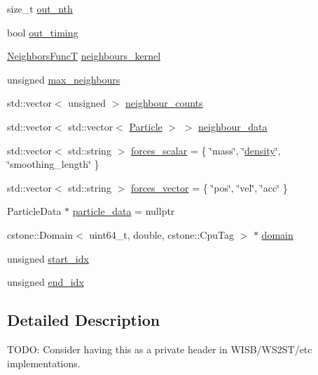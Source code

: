 \begin{DoxyCompactItemize}
size\+\_\+t \mbox{\hyperlink{namespacewash_aa9f79200cc65dc6e48b4ef9af5d0c389}{out\+\_\+nth}}
\item 
bool \mbox{\hyperlink{namespacewash_a6e885743f18d66ca373fb6c4c0146d1d}{out\+\_\+timing}}
\item 
\mbox{\hyperlink{namespacewash_a8135d763bfc59fce07b49873d8af0ed6}{Neighbors\+FuncT}} \mbox{\hyperlink{namespacewash_a0d969973e893cc2316bad2597bf0ad17}{neighbours\+\_\+kernel}}
\item 
unsigned \mbox{\hyperlink{namespacewash_a17d27449eff38aaca1e4206070bbb868}{max\+\_\+neighbours}}
\item 
std\+::vector$<$ unsigned $>$ \mbox{\hyperlink{namespacewash_a15b300d4e8a12c38c1e54650db4476f1}{neighbour\+\_\+counts}}
\item 
std\+::vector$<$ std\+::vector$<$ \mbox{\hyperlink{classwash_1_1Particle}{Particle}} $>$ $>$ \mbox{\hyperlink{namespacewash_aa6580757775fdbcb82b9a6b6f75332a1}{neighbour\+\_\+data}}
\item 
std\+::vector$<$ std\+::string $>$ \mbox{\hyperlink{namespacewash_a9c297685f13f82d6f804157081b56402}{forces\+\_\+scalar}} = \{ \char`\"{}mass\char`\"{}, \char`\"{}\mbox{\hyperlink{3d__fluid__sim_2fluid__sim_8cpp_a140d94d7edb97c062961056d1926a2db}{density}}\char`\"{}, \char`\"{}smoothing\+\_\+length\char`\"{} \}
\item 
std\+::vector$<$ std\+::string $>$ \mbox{\hyperlink{namespacewash_a0dce58e51e269cb2298f5ec6648f28ab}{forces\+\_\+vector}} = \{ \char`\"{}pos\char`\"{}, \char`\"{}vel\char`\"{}, \char`\"{}acc\char`\"{} \}
\item 
Particle\+Data $\ast$ \mbox{\hyperlink{namespacewash_ae61aecb586450fdd500b953593701239}{particle\+\_\+data}} = nullptr
\item 
cstone\+::\+Domain$<$ uint64\+\_\+t, double, cstone\+::\+Cpu\+Tag $>$ $\ast$ \mbox{\hyperlink{namespacewash_a53e8b34558bb0851dd0c229c8d720f28}{domain}}
\item 
unsigned \mbox{\hyperlink{namespacewash_a820391e694539fac01ed9916b92b427c}{start\+\_\+idx}}
\item 
unsigned \mbox{\hyperlink{namespacewash_a46edd0c40cbb3607c190c2acab5fe7b4}{end\+\_\+idx}}
\end{DoxyCompactItemize}


\subsection{Detailed Description}
T\+O\+DO\+: Consider having this as a private header in W\+I\+S\+B/\+W\+S2\+S\+T/etc implementations. 

